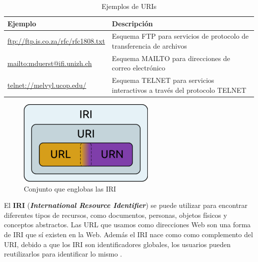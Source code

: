 \begin{table}[H]
	\caption{Ejemplos de URIs}
	\label{uris}
	\centering
	\begin{tabular}{|m{5.6cm}|m{5.6cm}|}
		\rowcolor[HTML]{EFEFEF} 
		\hline
		Ejemplo & Descripción \\ \hline
		\url{ftp://ftp.is.co.za/rfc/rfc1808.txt} & Esquema FTP para servicios de protocolo de transferencia de archivos\\ \hline
		\url{mailto:mduerst@ifi.unizh.ch} & Esquema MAILTO para direcciones de correo electrónico \\ \hline
		\url{telnet://melvyl.ucop.edu/} & Esquema TELNET para servicios interactivos a través del protocolo TELNET\\ \hline
	\end{tabular}
\end{table}

\begin{figure}[H]
	\centering
	\includegraphics[width=0.35\linewidth]{imagenes/capitulo3/URI}
	\caption{Conjunto que englobas las IRI}
	\label{fig:250px-irivenndiagramm}
\end{figure}

El \textbf{IRI} (\textit{\textbf{International Resource Identifier}}) se puede utilizar para encontrar diferentes tipos de recursos, como documentos, personas, objetos físicos y conceptos abstractos. Las URL que usamos como direcciones Web son una forma de IRI que sí existen en la Web. Además el IRI nace como como complemento del URI, debido a que los IRI son identificadores globales, los usuarios pueden reutilizarlos para identificar lo mismo \cite{libro-gis}.






